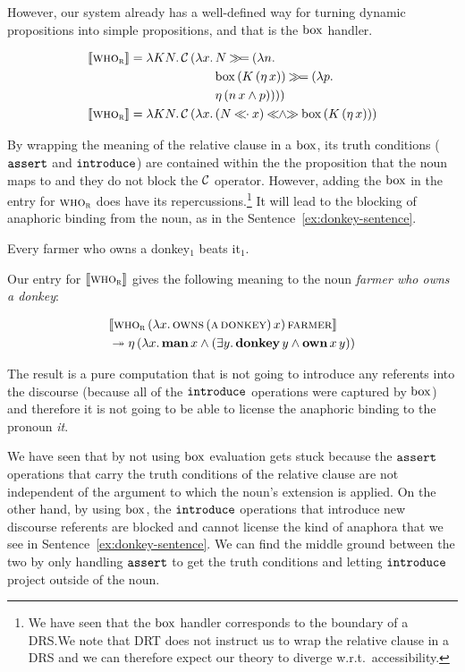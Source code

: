 However, our system already has a well-defined way for turning dynamic
propositions into simple propositions, and that is the $\mathrm{box}$ handler.

\begin{align*}
  \sem{\abs{who}_{\abs{r}}} = \lam{K N}{\ap{\CC}{(\lam{x}{
    &N \hsbind (\lam{n}{ \\
    &\ap{\BOX}{(\ap{K}{(\etaE{x})})} \hsbind (\lam{p}{ \\
    &\etaE{(\ap{n}{x} \land p)}})})})}} \\
  \sem{\abs{who}_{\abs{r}}} = \lam{K N}{\ap{\CC}{(\lam{x}{
    &(N \apl x) \andlr \ap{\BOX}{(\ap{K}{(\etaE{x})})}})}}
\end{align*}

By wrapping the meaning of the relative clause in a $\mathrm{box}$, its truth
conditions ($\mathtt{assert}$ and $\mathtt{introduce}$) are contained within the
the proposition that the noun maps to and they do not block the $\mathcal{C}$
operator. However, adding the $\mathrm{box}$ in the entry for $\textsc{who}_{\textsc{r}}$
does have its repercussions.\footnote{We have seen that the $\mathrm{box}$ handler
  corresponds to the boundary of a DRS.\@ We note that DRT does not
  instruct us to wrap the relative clause in a DRS and we can therefore
  expect our theory to diverge w.r.t.\ accessibility.} It will lead to the
blocking of anaphoric binding from the noun, as in the
Sentence~\ref{ex:donkey-sentence}.

\begin{exe}
  \ex Every farmer who owns a donkey$_1$ beats it$_1$. \label{ex:donkey-sentence}
\end{exe}

Our entry for $\llbracket \textsc{who}_{\textsc{r}} \rrbracket$ gives the following meaning to
the noun \emph{farmer who owns a donkey}:

\begin{align*}
& \llbracket \textsc{who}_{\textsc{r}}\,(\lambda x.\, \textsc{owns}\,(\textsc{a}\,\textsc{donkey})\,x)\,\textsc{farmer} \rrbracket \\
& \twoheadrightarrow \eta\,(\lambda x.\, \textbf{man}\,x \land (\exists y.\, \textbf{donkey}\,y \land \textbf{own}\,x\,y))
\end{align*}

The result is a pure computation that is not going to introduce any
referents into the discourse (because all of the $\mathtt{introduce}$
operations were captured by $\mathrm{box}$) and therefore it is not going to be
able to license the anaphoric binding to the pronoun \emph{it}.

We have seen that by not using $\mathrm{box}$ evaluation gets stuck because the
$\mathtt{assert}$ operations that carry the truth conditions of the relative
clause are not independent of the argument to which the noun's extension is
applied. On the other hand, by using $\mathrm{box}$, the $\mathtt{introduce}$
operations that introduce new discourse referents are blocked and cannot
license the kind of anaphora that we see in
Sentence~\ref{ex:donkey-sentence}. We can find the middle ground between
the two by only handling $\mathtt{assert}$ to get the truth conditions and
letting $\mathtt{introduce}$ project outside of the noun.

